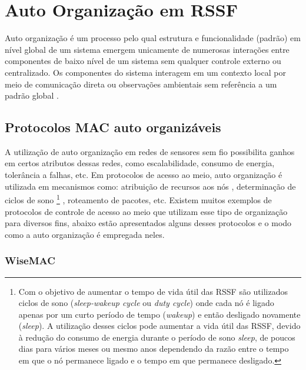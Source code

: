 \section{Auto Organização em RSSF}

 Auto organização é um processo pelo qual estrutura e funcionalidade (padrão) em nível global de um sistema emergem unicamente de numerosas interações entre componentes de baixo nível de um sistema sem qualquer controle externo ou centralizado. Os componentes do sistema interagem em um contexto local por meio de comunicação direta ou observações ambientais sem referência a um padrão global \cite{Dressler2008}.
 
 \subsection{Protocolos MAC auto organizáveis}
 
 A utilização de auto organização em redes de sensores sem fio possibilita ganhos em certos atributos dessas redes, como escalabilidade, consumo de energia, tolerância a falhas, etc. Em protocolos de acesso ao meio, auto organização é utilizada em mecanismos como: atribuição de recursos aos nós \cite{Dressler2008}, determinação de ciclos de sono%
 \footnote{Com o objetivo de aumentar o tempo de vida útil das RSSF são utilizados ciclos de sono (\textit{sleep-wakeup cycle} ou \textit{duty cycle}) onde cada nó é ligado apenas por um curto período de tempo (\textit{wakeup}) e então desligado novamente (\textit{sleep}). A utilização desses ciclos pode aumentar a vida útil das RSSF, devido à redução do consumo de energia durante o período de sono \textit{sleep}, de poucos dias para vários meses ou mesmo anos dependendo da razão entre o tempo em que o nó permanece ligado e o tempo em que permanece desligado.}
 \cite{Halkes:2005}, roteamento de pacotes, etc. Existem muitos exemplos de protocolos de controle de acesso ao meio que utilizam esse tipo de organização para diversos fins, abaixo estão apresentados alguns desses protocolos e o modo como a auto organização é empregada neles.
 
 \subsubsection{WiseMAC}
 
